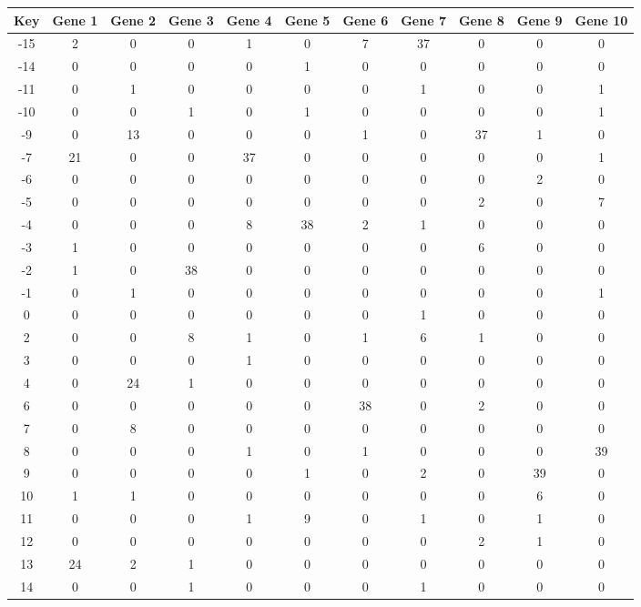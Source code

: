 \begin{tabular}{|c|c|c|c|c|c|c|c|c|c|c|}
\hline
Key & Gene 1 & Gene 2 & Gene 3 & Gene 4 & Gene 5 & Gene 6 & Gene 7 & Gene 8 & Gene 9 & Gene 10 \\
\hline
-15 & 2 & 0 & 0 & 1 & 0 & 7 & 37 & 0 & 0 & 0 \\
-14 & 0 & 0 & 0 & 0 & 1 & 0 & 0 & 0 & 0 & 0 \\
-11 & 0 & 1 & 0 & 0 & 0 & 0 & 1 & 0 & 0 & 1 \\
-10 & 0 & 0 & 1 & 0 & 1 & 0 & 0 & 0 & 0 & 1 \\
-9 & 0 & 13 & 0 & 0 & 0 & 1 & 0 & 37 & 1 & 0 \\
-7 & 21 & 0 & 0 & 37 & 0 & 0 & 0 & 0 & 0 & 1 \\
-6 & 0 & 0 & 0 & 0 & 0 & 0 & 0 & 0 & 2 & 0 \\
-5 & 0 & 0 & 0 & 0 & 0 & 0 & 0 & 2 & 0 & 7 \\
-4 & 0 & 0 & 0 & 8 & 38 & 2 & 1 & 0 & 0 & 0 \\
-3 & 1 & 0 & 0 & 0 & 0 & 0 & 0 & 6 & 0 & 0 \\
-2 & 1 & 0 & 38 & 0 & 0 & 0 & 0 & 0 & 0 & 0 \\
-1 & 0 & 1 & 0 & 0 & 0 & 0 & 0 & 0 & 0 & 1 \\
0 & 0 & 0 & 0 & 0 & 0 & 0 & 1 & 0 & 0 & 0 \\
2 & 0 & 0 & 8 & 1 & 0 & 1 & 6 & 1 & 0 & 0 \\
3 & 0 & 0 & 0 & 1 & 0 & 0 & 0 & 0 & 0 & 0 \\
4 & 0 & 24 & 1 & 0 & 0 & 0 & 0 & 0 & 0 & 0 \\
6 & 0 & 0 & 0 & 0 & 0 & 38 & 0 & 2 & 0 & 0 \\
7 & 0 & 8 & 0 & 0 & 0 & 0 & 0 & 0 & 0 & 0 \\
8 & 0 & 0 & 0 & 1 & 0 & 1 & 0 & 0 & 0 & 39 \\
9 & 0 & 0 & 0 & 0 & 1 & 0 & 2 & 0 & 39 & 0 \\
10 & 1 & 1 & 0 & 0 & 0 & 0 & 0 & 0 & 6 & 0 \\
11 & 0 & 0 & 0 & 1 & 9 & 0 & 1 & 0 & 1 & 0 \\
12 & 0 & 0 & 0 & 0 & 0 & 0 & 0 & 2 & 1 & 0 \\
13 & 24 & 2 & 1 & 0 & 0 & 0 & 0 & 0 & 0 & 0 \\
14 & 0 & 0 & 1 & 0 & 0 & 0 & 1 & 0 & 0 & 0 \\
\hline
\end{tabular}